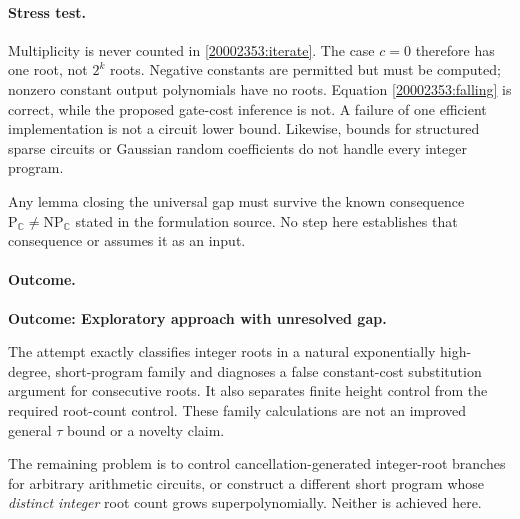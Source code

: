 \documentclass[11pt,a4paper]{article}
\newcommand{\C}{\mathbb{C}}
\numberwithin{equation}{section}
\begin{document}
\paragraph{Stress test.}
Multiplicity is never counted in \eqref{20002353:iterate}. The case $c=0$
therefore has one root, not $2^k$ roots. Negative constants are permitted
but must be computed; nonzero constant output polynomials have no roots.
Equation \eqref{20002353:falling} is correct, while the proposed gate-cost
inference is not. A failure of one efficient implementation is not a
circuit lower bound. Likewise, bounds for structured sparse circuits or
Gaussian random coefficients do not handle every integer program.

Any lemma closing the universal gap must survive the known consequence
$\mathrm P_{\C}\ne\mathrm{NP}_{\C}$ stated in the formulation source.
No step here establishes that consequence or assumes it as an input.

\paragraph{Outcome.}
\textbf{Outcome: Exploratory approach with unresolved gap.}

The attempt exactly classifies integer roots in a natural exponentially
high-degree, short-program family and diagnoses a false constant-cost
substitution argument for consecutive roots. It also separates finite
height control from the required root-count control. These family
calculations are not an improved general $\tau$ bound or a novelty claim.

The remaining problem is to control cancellation-generated integer-root
branches for arbitrary arithmetic circuits, or construct a different
short program whose \emph{distinct integer} root count grows
superpolynomially. Neither is achieved here.
\end{document}
